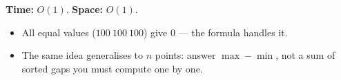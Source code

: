 \begin{complexitybox}
\textbf{Time:} $O(1)$. \textbf{Space:} $O(1)$.
\end{complexitybox}

\begin{pitfallbox}
\begin{itemize}
  \item All equal values ($100\ 100\ 100$) give $0$ --- the formula
        handles it.
  \item The same idea generalises to $n$ points: answer $\max-\min$, not a
        sum of sorted gaps you must compute one by one.
\end{itemize}
\end{pitfallbox}
